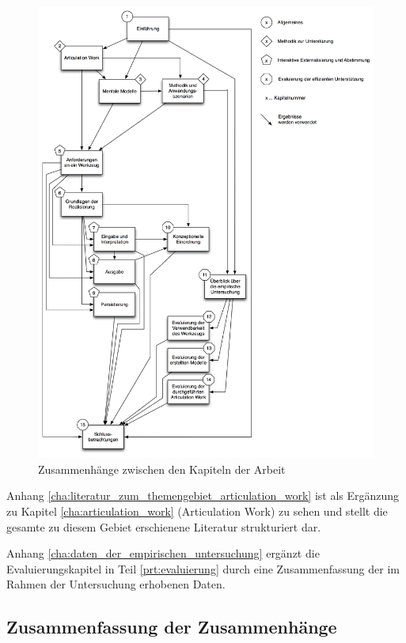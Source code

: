 \begin{figure}[htbp]
	\centering
		\includegraphics[height=0.9\textheight]{img/Einfuehrung/gesamtueberblick.png}
	\caption{Zusammenhänge zwischen den Kapiteln der Arbeit}
	\label{fig:img_Einfuehrung_gesamtueberblick}
\end{figure}

Anhang \ref{cha:literatur_zum_themengebiet_articulation_work} ist als Ergänzung zu Kapitel \ref{cha:articulation_work} (Articulation Work) zu sehen und stellt die gesamte zu diesem Gebiet erschienene Literatur strukturiert dar.

Anhang \ref{cha:daten_der_empirischen_untersuchung} ergänzt die Evaluierungskapitel in Teil \ref{prt:evaluierung} durch eine Zusammenfassung der im Rahmen der Untersuchung erhobenen Daten.

\subsection{Zusammenfassung der Zusammenhänge} %
\label{sub:zusammenhänge}


